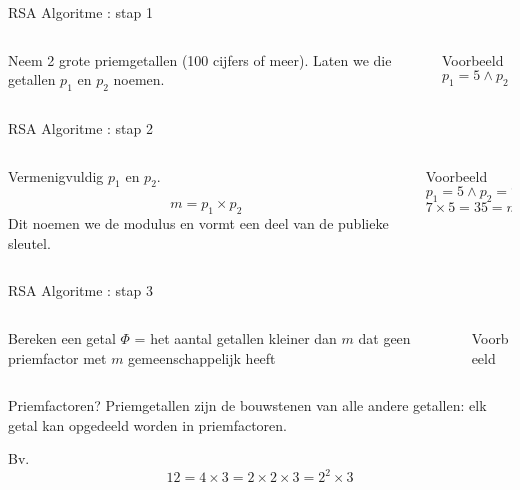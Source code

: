 \documentclass{beamer}
\begin{document}
\begin{frame}{RSA Algoritme : stap 1}
	\begin{columns}
		\begin{column}[T]{0.5\textwidth}
			Neem 2 grote priemgetallen (100 cijfers of meer). 
			Laten we die getallen $p_1$ en $p_2$ noemen.
		\end{column}
			\begin{column}[T]{0.5\textwidth}
				Voorbeeld
		\[ p_1 = 5 \wedge  p_2 = 7\]
		\end{column}
	\end{columns}
	
	

\end{frame}

\begin{frame}{RSA Algoritme : stap 2}
	\begin{columns}
		\begin{column}[T]{0.5\textwidth}
Vermenigvuldig $p_1$ en $p_2$. 

\[ m = p_1 \times p_2  \]
Dit noemen we de modulus en vormt een deel van de publieke sleutel. 
		\end{column}
		\begin{column}[T]{0.5\textwidth}
			Voorbeeld
			\[ p_1 = 5 \wedge  p_2 = 7\]
			\[ 7 \times 5 = 35 = m \]
		\end{column}
	\end{columns}	
\end{frame}

\begin{frame}{RSA Algoritme : stap 3}
	\begin{columns}
		\begin{column}[T]{0.5\textwidth}
			Bereken een getal $\Phi$ =  het aantal getallen kleiner dan $m$ dat geen priemfactor met $m$ gemeenschappelijk heeft
		\end{column}
		\begin{column}[T]{0.5\textwidth}
			Voorbeeld

		\end{column}
	\end{columns}	
\end{frame}

\begin{frame}{Priemfactoren?}
	Priemgetallen zijn de bouwstenen van alle andere getallen:  elk getal kan opgedeeld worden in priemfactoren. 
	
	Bv. 
	\[
		12 = 4 \times 3 = 2 \times 2 \times 3 = 2^2 \times 3
	\]
	
	
\end{frame}
\end{document}
